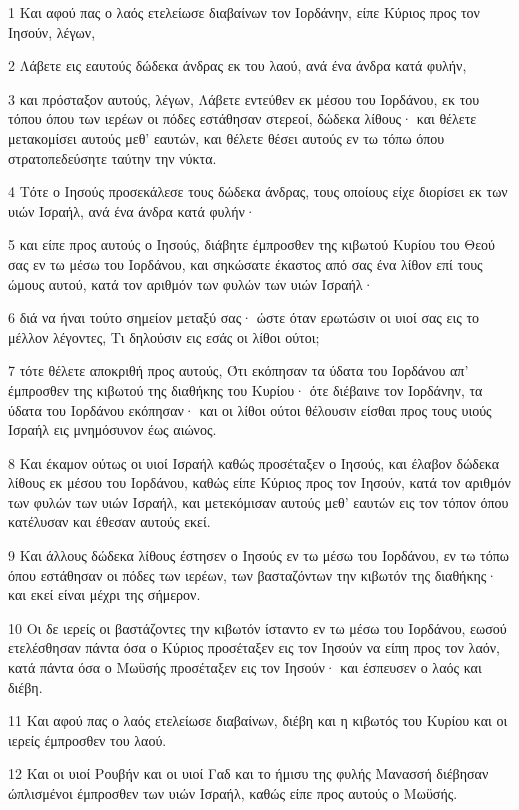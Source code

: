 \par 1 Και αφού πας ο λαός ετελείωσε διαβαίνων τον Ιορδάνην, είπε Κύριος προς τον Ιησούν, λέγων,
\par 2 Λάβετε εις εαυτούς δώδεκα άνδρας εκ του λαού, ανά ένα άνδρα κατά φυλήν,
\par 3 και πρόσταξον αυτούς, λέγων, Λάβετε εντεύθεν εκ μέσου του Ιορδάνου, εκ του τόπου όπου των ιερέων οι πόδες εστάθησαν στερεοί, δώδεκα λίθους· και θέλετε μετακομίσει αυτούς μεθ' εαυτών, και θέλετε θέσει αυτούς εν τω τόπω όπου στρατοπεδεύσητε ταύτην την νύκτα.
\par 4 Τότε ο Ιησούς προσεκάλεσε τους δώδεκα άνδρας, τους οποίους είχε διορίσει εκ των υιών Ισραήλ, ανά ένα άνδρα κατά φυλήν·
\par 5 και είπε προς αυτούς ο Ιησούς, διάβητε έμπροσθεν της κιβωτού Κυρίου του Θεού σας εν τω μέσω του Ιορδάνου, και σηκώσατε έκαστος από σας ένα λίθον επί τους ώμους αυτού, κατά τον αριθμόν των φυλών των υιών Ισραήλ·
\par 6 διά να ήναι τούτο σημείον μεταξύ σας· ώστε όταν ερωτώσιν οι υιοί σας εις το μέλλον λέγοντες, Τι δηλούσιν εις εσάς οι λίθοι ούτοι;
\par 7 τότε θέλετε αποκριθή προς αυτούς, Ότι εκόπησαν τα ύδατα του Ιορδάνου απ' έμπροσθεν της κιβωτού της διαθήκης του Κυρίου· ότε διέβαινε τον Ιορδάνην, τα ύδατα του Ιορδάνου εκόπησαν· και οι λίθοι ούτοι θέλουσιν είσθαι προς τους υιούς Ισραήλ εις μνημόσυνον έως αιώνος.
\par 8 Και έκαμον ούτως οι υιοί Ισραήλ καθώς προσέταξεν ο Ιησούς, και έλαβον δώδεκα λίθους εκ μέσου του Ιορδάνου, καθώς είπε Κύριος προς τον Ιησούν, κατά τον αριθμόν των φυλών των υιών Ισραήλ, και μετεκόμισαν αυτούς μεθ' εαυτών εις τον τόπον όπου κατέλυσαν και έθεσαν αυτούς εκεί.
\par 9 Και άλλους δώδεκα λίθους έστησεν ο Ιησούς εν τω μέσω του Ιορδάνου, εν τω τόπω όπου εστάθησαν οι πόδες των ιερέων, των βασταζόντων την κιβωτόν της διαθήκης· και εκεί είναι μέχρι της σήμερον.
\par 10 Οι δε ιερείς οι βαστάζοντες την κιβωτόν ίσταντο εν τω μέσω του Ιορδάνου, εωσού ετελέσθησαν πάντα όσα ο Κύριος προσέταξεν εις τον Ιησούν να είπη προς τον λαόν, κατά πάντα όσα ο Μωϋσής προσέταξεν εις τον Ιησούν· και έσπευσεν ο λαός και διέβη.
\par 11 Και αφού πας ο λαός ετελείωσε διαβαίνων, διέβη και η κιβωτός του Κυρίου και οι ιερείς έμπροσθεν του λαού.
\par 12 Και οι υιοί Ρουβήν και οι υιοί Γαδ και το ήμισυ της φυλής Μανασσή διέβησαν ώπλισμένοι έμπροσθεν των υιών Ισραήλ, καθώς είπε προς αυτούς ο Μωϋσής.
